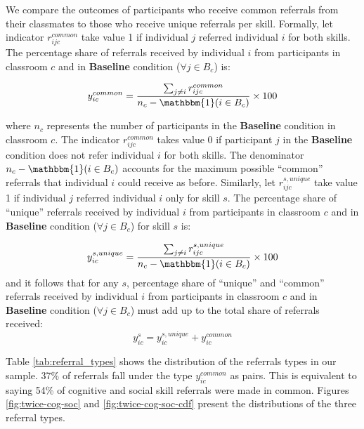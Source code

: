 \documentclass[11pt,a4paper,oneside]{article}
\begin{document}
We compare the outcomes of participants who receive common referrals from their classmates to those who receive unique referrals per skill. Formally, let indicator $r_{ijc}^{common}$ take value 1 if individual $j$ referred individual $i$ for both skills. The percentage share of referrals received by individual $i$ from participants in classroom $c$ and in \textbf{Baseline} condition ($\forall j \in B_c$) is: 

\begin{equation}
  y_{ic}^{common} = \frac{\sum_{j \neq i} r_{ijc}^{common}}{n_c - \mathbbm{1}(i \in B_c)} \times 100
  \end{equation}

where $n_c$ represents the number of participants in the \textbf{Baseline} condition in classroom $c$. The indicator $r_{ijc}^{common}$ takes value 0 if participant $j$ in the \textbf{Baseline} condition does not refer individual $i$ for both skills. The denominator $n_c - \mathbbm{1}(i \in B_c)$ accounts for the maximum possible ``common'' referrals that individual $i$ could receive as before. Similarly, let $r_{ijc}^{s,unique}$ take value 1 if individual $j$ referred individual $i$ only for skill $s$. The percentage share of ``unique'' referrals received by individual $i$ from participants in classroom $c$ and in \textbf{Baseline} condition ($\forall j \in B_c$) for skill $s$ is: 

\begin{equation}\label{single_def}
  y_{ic}^{s,unique} = \frac{\sum_{j \neq i} r_{ijc}^{s,unique}}{n_c - \mathbbm{1}(i \in B_c)} \times 100
  \end{equation}
and it follows that for any $s$, percentage share of ``unique'' and ``common'' referrals received by individual $i$ from participants in classroom $c$ and in \textbf{Baseline} condition ($\forall j \in B_c$) must add up to the total share of referrals received:
\begin{equation}\label{single_twice}
  y_{ic}^{s} = y_{ic}^{s,unique} + y_{ic}^{common}
  \end{equation}

Table \ref{tab:referral_types} shows the distribution of the referrals types in our sample. 37\% of referrals fall under the type $y_{ic}^{common}$ as pairs. This is equivalent to saying 54\% of cognitive and social skill referrals were made in common. Figures \ref{fig:twice-cog-soc} and \ref{fig:twice-cog-soc-cdf} present the distributions of the three referral types.
\end{document}
